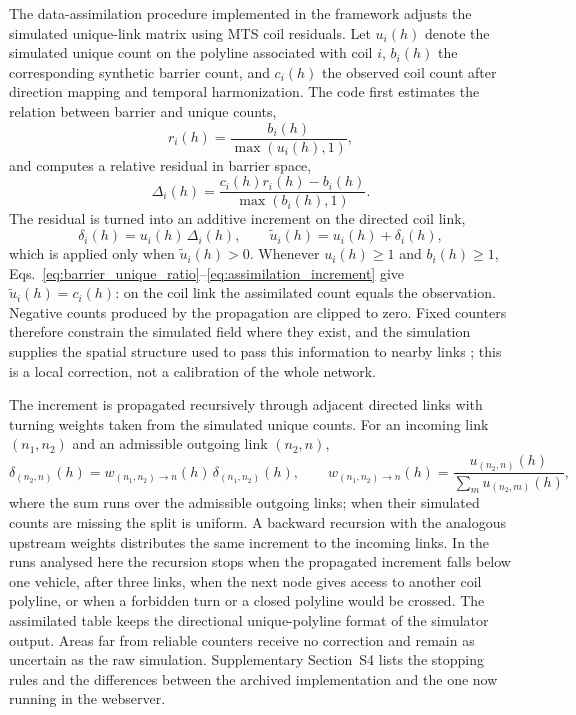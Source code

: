 \documentclass[pdflatex,Numbered]{sn-jnl}
\begin{document}
The data-assimilation procedure implemented in the framework adjusts the
simulated unique-link matrix using MTS coil residuals. Let $u_i(h)$ denote
the simulated unique count on the polyline associated with coil $i$,
$b_i(h)$ the corresponding synthetic barrier count, and $c_i(h)$ the
observed coil count after direction mapping and temporal harmonization. The
code first estimates the relation between barrier and unique counts,
\begin{equation}
  r_i(h) = \frac{b_i(h)}{\max(u_i(h),1)} ,
  \label{eq:barrier_unique_ratio}
\end{equation}
and computes a relative residual in barrier space,
\begin{equation}
  \Delta_i(h) =
  \frac{c_i(h) r_i(h) - b_i(h)}
       {\max(b_i(h),1)} .
  \label{eq:coil_residual}
\end{equation}
The residual is turned into an additive increment on the directed coil link,
\begin{equation}
  \delta_i(h) = u_i(h)\,\Delta_i(h), \qquad
  \tilde u_i(h) = u_i(h) + \delta_i(h) ,
  \label{eq:assimilation_increment}
\end{equation}
which is applied only when $\tilde u_i(h)>0$. Whenever $u_i(h)\ge 1$ and $b_i(h)\ge 1$, Eqs.~\eqref{eq:barrier_unique_ratio}--\eqref{eq:assimilation_increment} give $\tilde u_i(h)=c_i(h)$: on the coil link the assimilated count equals the observation. Negative counts produced by the propagation are clipped to zero. Fixed counters therefore constrain the simulated field where they exist, and the simulation supplies the spatial structure used to pass this information to nearby links \cite{herrera2010,seo2017}; this is a local correction, not a calibration of the whole network.

The increment is propagated recursively through adjacent directed links with turning weights taken from the simulated unique counts. For an incoming link $(n_1,n_2)$ and an admissible outgoing link $(n_2,n)$,
\begin{equation}
  \delta_{(n_2,n)}(h) = w_{(n_1,n_2)\to n}(h)\,\delta_{(n_1,n_2)}(h), \qquad
  w_{(n_1,n_2)\to n}(h) = \frac{u_{(n_2,n)}(h)}{\sum_{m} u_{(n_2,m)}(h)} ,
  \label{eq:propagation}
\end{equation}
where the sum runs over the admissible outgoing links; when their simulated counts are missing the split is uniform. A backward recursion with the analogous upstream weights distributes the same increment to the incoming links. In the runs analysed here the recursion stops when the propagated increment falls below one vehicle, after three links, when the next node gives access to another coil polyline, or when a forbidden turn or a closed polyline would be crossed. The assimilated table keeps the directional unique-polyline format of the simulator output. Areas far from reliable counters receive no correction and remain as uncertain as the raw simulation. Supplementary Section~S4 lists the stopping rules and the differences between the archived implementation and the one now running in the webserver.
\end{document}
